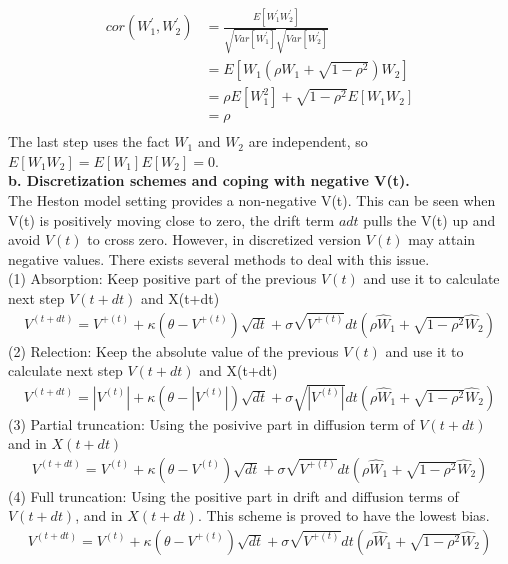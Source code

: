 \documentclass[a4paper]{article}
\begin{document}
\begin{align*}
	cor(W_1^{'}, W_2^{'}) & = \frac{E[W_1^{'}W_2^{'}]}{\sqrt{Var[W_1^{'}]}\sqrt{Var[W_2^{'}]}}\\
		      & = E[W_1 (\rho W_1 +\sqrt{1 - \rho^2})W_2] \\
		      & = \rho E[W_1^2] + \sqrt{1 - \rho^2} E[W_1 W_2] \\
		      & = \rho \\
\end{align*}
The last step uses the fact $W_1$ and $W_2$ are independent, so $E[W_1 W_2] = E[W_1] E[W_2] = 0$.\\
{\bf b. Discretization schemes and coping with negative V(t). } \\
The Heston model setting provides a non-negative V(t). This can be seen when V(t) is positively moving close to zero, the drift term $adt$ pulls the V(t) up and avoid $V(t)$ to cross zero. However, in discretized version $V(t)$ may attain negative values. There exists several methods to deal with this issue.\\
(1) Absorption: Keep positive part of the previous $V(t)$ and use it to calculate next step $V(t+dt)$ and X(t+dt)\\
\begin{align*}
	V^{(t + dt)} = V^{+(t)} + \kappa (\theta -  V^{+(t)}) \sqrt{dt} + \sigma \sqrt{V^{+(t)}} dt (\rho \hat W_1
	+ \sqrt{1 - \rho^2} \hat W_2)
\end{align*}
(2) Relection: Keep the absolute value of the previous $V(t)$ and use it to calculate next step $V(t+dt)$ and X(t+dt)\\
\begin{align*}
	V^{(t + dt)} = |V^{(t)}| + \kappa (\theta -  |V^{(t)}|) \sqrt{dt} + \sigma \sqrt{|V^{(t)}|}  dt (\rho \hat W_1
	+ \sqrt{1 - \rho^2} \hat W_2)
\end{align*}
(3) Partial truncation: Using the posivive part in diffusion term of $V(t+dt)$ and in $X(t + dt)$\\
\begin{align*}
	V^{(t + dt)} = V^{(t)} + \kappa(\theta -  V^{(t)}) \sqrt{dt} + \sigma \sqrt{V^{+(t)}} dt (\rho \hat W_1
	+ \sqrt{1 - \rho^2} \hat W_2)
\end{align*}
(4) Full truncation\cite{fulltruncation}: Using the positive part in drift and diffusion terms of $V(t + dt)$, and in $X(t + dt)$. 
This scheme is proved to have the lowest bias.
\begin{align}
	V^{(t + dt)} = V^{(t)} + \kappa(\theta -  V^{+(t)}) \sqrt{dt} + \sigma \sqrt{V^{+(t)}} dt (\rho \hat W_1
	+ \sqrt{1 - \rho^2} \hat W_2)  \label{full_truncation}
\end{align}
\end{document}

